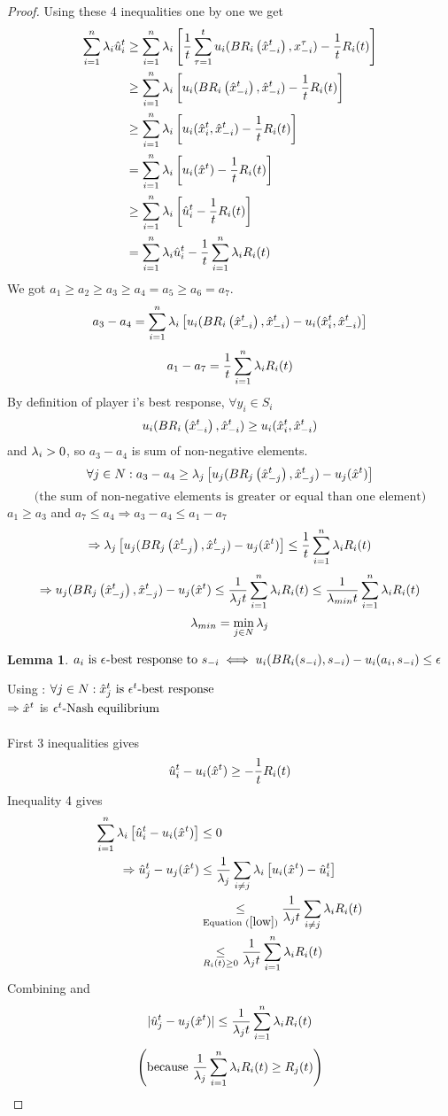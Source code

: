 \documentclass[11pt]{article}
\newtheorem{lemma}[theorem]{Lemma}
\theoremstyle{definition}
\theoremstyle{definition}
\begin{document}
\begin{proof}
	Using these 4 inequalities one by one we get
	\begin{align*}
		\sum_{i=1}^n \lambda_i \hat u^{t}_i & \geq \sum_{i=1}^n \lambda_i \left[ \frac{1}{t} \sum_{\tau=1}^t u_i (BR_i\left( \hat x^{t}_{-i} \right),x_{-i}^\tau) - \frac{1}{t} R_i(t) \right]\\
				 & \geq \sum_{i=1}^n \lambda_i \left[ u_i (BR_i\left( \hat x^{t}_{-i} \right),\hat x^{t}_{-i}) - \frac{1}{t} R_i(t) \right]\\
				 & \geq \sum_{i=1}^n \lambda_i \left[ u_i (\hat x^{t}_i,\hat x^{t}_{-i}) - \frac{1}{t} R_i(t) \right]\\
				 & =    \sum_{i=1}^n \lambda_i \left[ u_i(\hat x^{t}) - \frac{1}{t} R_i(t) \right]\\
				 & \geq \sum_{i=1}^n \lambda_i \left[ \hat u^{t}_i - \frac{1}{t} R_i(t) \right]\\
				 & =    \sum_{i=1}^n \lambda_i \hat u^{t}_i - \frac{1}{t} \sum_{i=1}^n \lambda_i R_i(t)
	\end{align*}
	We got $a_1 \geq a_2 \geq a_3 \geq a_4 = a_5 \geq a_6 = a_7$.\\
	$$a_3 - a_4 = \sum_{i=1}^n \lambda_i \left[ u_i (BR_i\left( \hat x^{t}_{-i} \right),\hat x^{t}_{-i}) - u_i (\hat x^{t}_i,\hat x^{t}_{-i}) \right]$$
	$$a_1 - a_7 = \frac{1}{t} \sum_{i=1}^n \lambda_i R_i(t)$$
	By definition of player i's best response, $\forall y_i \in S_i$
	$$u_i (BR_i\left( \hat x^{t}_{-i} \right),\hat x^{t}_{-i}) \geq u_i (\hat x^{t}_i,\hat x^{t}_{-i})$$
	and $\lambda_i > 0$, so $a_3 - a_4$ is sum of non-negative elements.
	$$\forall j \in N : a_3 - a_4 \geq \lambda_j \left[ u_j (BR_j\left( \hat x^{t}_{-j} \right),\hat x^{t}_{-j}) - u_j(\hat x^{t}) \right]$$
	$$\text{(the sum of non-negative elements is greater or equal than one element)}$$
	$a_1 \geq a_3$ and $a_7 \leq a_4 \Rightarrow a_3 - a_4 \leq a_1 - a_7$
	$$\Rightarrow \lambda_j \left[ u_j (BR_j\left( \hat x^{t}_{-j} \right),\hat x^{t}_{-j}) - u_j(\hat x^{t}) \right] \leq \frac{1}{t} \sum_{i=1}^n \lambda_i R_i(t)$$
	$$\Rightarrow u_j (BR_j\left( \hat x^{t}_{-j} \right),\hat x^{t}_{-j}) - u_j(\hat x^{t}) \leq \frac{1}{\lambda_j t} \sum_{i=1}^n \lambda_i R_i(t) \leq \frac{1}{\lambda_{min} t} \sum_{i=1}^n \lambda_i R_i(t)$$
	$$\lambda_{min} = \min_{j \in N} \lambda_j$$
	\begin{lemma}\label{bestr}
		$a_i \text{ is } \epsilon^{}\text{-best response} \text{ to } s_{-i} \iff u_i (BR_i(s_{-i}),s_{-i}) - u_i (a_i,s_{-i}) \leq \epsilon$
	\end{lemma}
	Using : $\forall j \in N : \hat x^{t}_j \text{ is } \epsilon^{t}\text{-best response}$\\
	\indent$\Rightarrow \hat x^{t}$ is $\epsilon^{t}\text{-Nash equilibrium}$\\\\
	First 3 inequalities gives
	\begin{equation}\label{low}
		\hat u^{t}_i - u_i(\hat x^{t}) \geq - \frac{1}{t} R_i(t)
	\end{equation}
	Inequality 4 gives
	\begin{equation}\label{up}
		\begin{split}
			\si \li \mpr{\uh{t}_i - u_i(\xh{t})} & \leq 0\\
			\Rightarrow \uh{t}_j - u_j(\xh{t}) & \leq \fracc{\lj} \sum_{i\neq j} \li \mpr{u_i(\xh{t}) - \uh{t}_i}\\
							   & \underset{\equi{low}}{\leq} \fracc{\lj t} \sum_{i\neq j} \li \rit\\
					       & \underset{\rit \geq 0}{\leq} \fracc{\lj t} \si \li \rit
		\end{split}
	\end{equation}
	Combining  and 
	$$| \hat u^{t}_j - u_j(\hat x^{t}) | \leq \frac{1}{\lambda_j t} \sum_{i=1}^n \lambda_i R_i(t)$$
	$$\left( \text{because } \frac{1}{\lambda_j} \sum_{i=1}^n \lambda_i R_i(t) \geq R_j(t) \right)$$
\end{proof}
\end{document}
